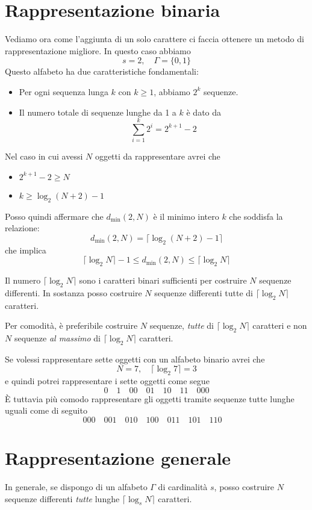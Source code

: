 \section{Rappresentazione binaria}\label{rappresentazione_binaria}
Vediamo ora come l'aggiunta di un solo carattere ci faccia ottenere un metodo di rappresentazione migliore. In questo caso
abbiamo
\[ s = 2, \quad \Gamma = \{ 0, 1 \} \]
Questo alfabeto ha due caratteristiche fondamentali:
\begin{itemize}
	\item Per ogni sequenza lunga $k$ con $k \geq 1$, abbiamo $2^k$ sequenze.
	\item Il numero totale di sequenze lunghe da 1 a $k$ \`e dato da
	      \[ \sum_{i = 1}^k 2^i = 2^{k + 1} - 2 \]
\end{itemize}
Nel caso in cui avessi $N$ oggetti da rappresentare avrei che
\begin{itemize}
	\item $2^{k + 1} - 2 \geq N$
	\item $k \geq \log_2 (N + 2) - 1$
\end{itemize}
Posso quindi affermare che $d_{\min}(2, N)$ \`e il minimo intero $k$ che soddisfa la relazione:
\[ d_{\min}(2, N) = \lceil \log_2 (N + 2) - 1 \rceil \]
che implica
\[ \lceil \log_2 N \rceil - 1 \leq d_{\min}(2, N) \leq \lceil \log_2 N \rceil \]

Il numero $\lceil \log_2 N \rceil$ sono i caratteri binari sufficienti per costruire $N$ sequenze differenti. In
sostanza posso costruire $N$ sequenze differenti tutte di $\lceil \log_2 N \rceil$ caratteri.

Per comodit\`a, \`e preferibile costruire $N$ sequenze, \emph{tutte} di $\lceil \log_2 N \rceil$ caratteri e non $N$
sequenze \emph{al massimo} di $\lceil \log_2 N \rceil$ caratteri.

\begin{example}
	Se volessi rappresentare sette oggetti con un alfabeto binario avrei che
	\[ N = 7, \quad \lceil \log_2 7 \rceil = 3 \]
	e quindi potrei rappresentare i sette oggetti come segue
	\[
		0 \quad
		1 \quad
		00 \quad
		01 \quad
		10 \quad
		11 \quad
		000
	\]
	\`E tuttavia pi\`u comodo rappresentare gli oggetti tramite sequenze tutte lunghe uguali come di seguito
	\[
		000 \quad
		001 \quad
		010 \quad
		100 \quad
		011 \quad
		101 \quad
		110 \quad
	\]
\end{example}

\section{Rappresentazione generale}\label{rappresentazione_generale}
In generale, se dispongo di un alfabeto $\Gamma$ di cardinalit\`a $s$, posso costruire $N$ sequenze differenti \emph{tutte}
lunghe $\lceil \log_s N \rceil$ caratteri.

